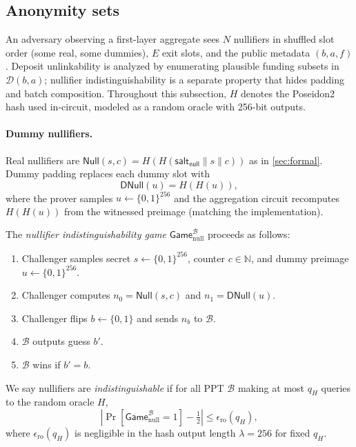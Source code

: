 \documentclass{iacrcc}
\newcommand{\Null}{\mathsf{Null}}
\newcommand{\DNull}{\mathsf{DNull}}
\begin{document}
\subsection{Anonymity sets}
\label{sec:layer0privacy}

An adversary observing a first-layer aggregate sees \(N\) nullifiers in shuffled slot order (some real, some dummies), \(E\) exit slots, and the public metadata \((b, a, f)\). Deposit unlinkability is analyzed by enumerating plausible funding subsets in \(\mathcal{D}(b,a)\); nullifier indistinguishability is a separate property that hides padding and batch composition. Throughout this subsection, \(H\) denotes the Poseidon2 hash used in-circuit, modeled as a random oracle with 256-bit outputs.

\paragraph{Dummy nullifiers.}
Real nullifiers are \(\Null(s,c) = H(H(\mathsf{salt_{null}} \parallel s \parallel c))\) as in \cref{sec:formal}. Dummy padding replaces each dummy slot with
\[
\DNull(u) = H(H(u)),
\]
where the prover samples \(u \gets \{0,1\}^{256}\) and the aggregation circuit recomputes \(H(H(u))\) from the witnessed preimage (matching the implementation).

\begin{definition}
The \emph{nullifier indistinguishability game} \(\mathsf{Game}_{\mathrm{null}}^{\mathcal{B}}\) proceeds as follows:
\begin{enumerate}
    \item Challenger samples secret \(s \gets \{0,1\}^{256}\), counter \(c \in \mathbb{N}\), and dummy preimage \(u \gets \{0,1\}^{256}\).
    \item Challenger computes \(n_0 = \Null(s,c)\) and \(n_1 = \DNull(u)\).
    \item Challenger flips \(b \gets \{0,1\}\) and sends \(n_b\) to \(\mathcal{B}\).
    \item \(\mathcal{B}\) outputs guess \(b'\).
    \item \(\mathcal{B}\) wins if \(b' = b\).
\end{enumerate}
We say nullifiers are \emph{indistinguishable} if for all PPT \(\mathcal{B}\) making at most \(q_H\) queries to the random oracle \(H\),
\[
\left|\Pr[\mathsf{Game}_{\mathrm{null}}^{\mathcal{B}} = 1] - \tfrac{1}{2}\right| \leq \epsilon_{\mathrm{ro}}(q_H),
\]
where \(\epsilon_{\mathrm{ro}}(q_H)\) is negligible in the hash output length \(\lambda = 256\) for fixed \(q_H\).
\end{definition}
\end{document}
